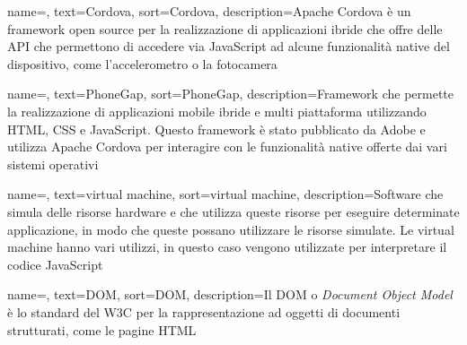 
\renewcommand{\acronymname}{Acronimi e abbreviazioni}

    




\renewcommand{\glossaryname}{Glossario}

{
    name=,
    text=Cordova,
    sort=Cordova,
    description={Apache Cordova è un framework open source per la realizzazione di applicazioni ibride che offre delle API che permettono di accedere via JavaScript ad alcune funzionalità native del dispositivo, come l'accelerometro o la fotocamera}
}

{
    name=,
    text=PhoneGap,
    sort=PhoneGap,
    description={Framework che permette la realizzazione di applicazioni mobile ibride e multi piattaforma utilizzando HTML, CSS e JavaScript. Questo framework è stato pubblicato da Adobe e utilizza Apache Cordova per   interagire con le funzionalità native offerte dai vari sistemi operativi}
}


{
    name=,
    text=virtual machine,
    sort=virtual machine,
    description={Software che simula delle risorse hardware e che utilizza queste risorse per eseguire determinate applicazione, in modo che queste possano utilizzare le risorse simulate. Le virtual machine hanno vari utilizzi, in questo caso vengono utilizzate per interpretare il codice JavaScript}
}

{
    name=,
    text=DOM,
    sort=DOM,
    description={Il DOM o \textit{Document Object Model} è lo standard del W3C per la rappresentazione ad oggetti di documenti strutturati, come le pagine HTML}
}

